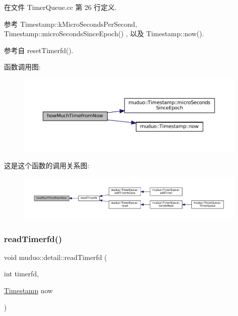 在文件 Timer\+Queue.\+cc 第 26 行定义.



参考 Timestamp\+::k\+Micro\+Seconds\+Per\+Second, Timestamp\+::micro\+Seconds\+Since\+Epoch() , 以及 Timestamp\+::now().



参考自 reset\+Timerfd().

函数调用图\+:
\nopagebreak
\begin{figure}[H]
\begin{center}
\leavevmode
\includegraphics[width=350pt]{namespacemuduo_1_1detail_a14924335d79da967a69c650af3002c77_cgraph}
\end{center}
\end{figure}
这是这个函数的调用关系图\+:
\nopagebreak
\begin{figure}[H]
\begin{center}
\leavevmode
\includegraphics[width=350pt]{namespacemuduo_1_1detail_a14924335d79da967a69c650af3002c77_icgraph}
\end{center}
\end{figure}
\mbox{\label{namespacemuduo_1_1detail_a08d79eafe298b7df1941adb4105bf75a}} 
\subsubsection{\texorpdfstring{read\+Timerfd()}{readTimerfd()}}
{\footnotesize\ttfamily void muduo\+::detail\+::read\+Timerfd (\begin{DoxyParamCaption}\item[{int}]{timerfd,  }\item[{\hyperlink{classmuduo_1_1Timestamp}{Timestamp}}]{now }\end{DoxyParamCaption})}




